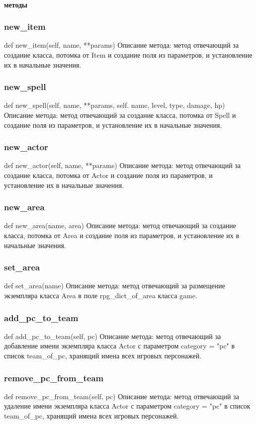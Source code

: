 \paragraph{методы}
\subsubsection{new\_item}
def new\_item(self, name, **params)
Описание метода: метод отвечающий за создание класса, потомка от Item и создание поля из параметров, и установление их в начальные значения.
\subsubsection{new\_spell}
def new\_spell(self, name, **params, self. name, level, type, damage, hp)
Описание метода: метод отвечающий за создание класса, потомка от Spell и создание поля из параметров, и установление их в начальные значения.
\subsubsection{new\_actor}
def new\_actor(self, name, **params)
Описание метода: метод отвечающий за создание класса, потомка от Actor и создание поля из параметров, и установление их в начальные значения.
\subsubsection{new\_area}
def new\_area(name, area)
Описание метода: метод отвечающий за создание класса, потомка от Area и создание поля из параметров, и установление их в начальные значения.
\subsubsection{set\_area}
def set\_area(name)
Описание метода: метод отвечающий за размещение экземпляра класса Area в поле rpg\_dict\_of\_area класса game.
\subsubsection{add\_pc\_to\_team}
def add\_pc\_to\_team(self, pc)
Описание метода: метод отвечающий за добавление имени экземпляра класса Actor с параметром category = "pc" в список team\_of\_pc, хранящий имена всех игровых персонажей.
\subsubsection{remove\_pc\_from\_team}
def remove\_pc\_from\_team(self, pc)
Описание метода: метод отвечающий за удаление имени экземпляра класса Actor с параметром category = "pc" в список team\_of\_pc, хранящий имена всех игровых персонажей.
